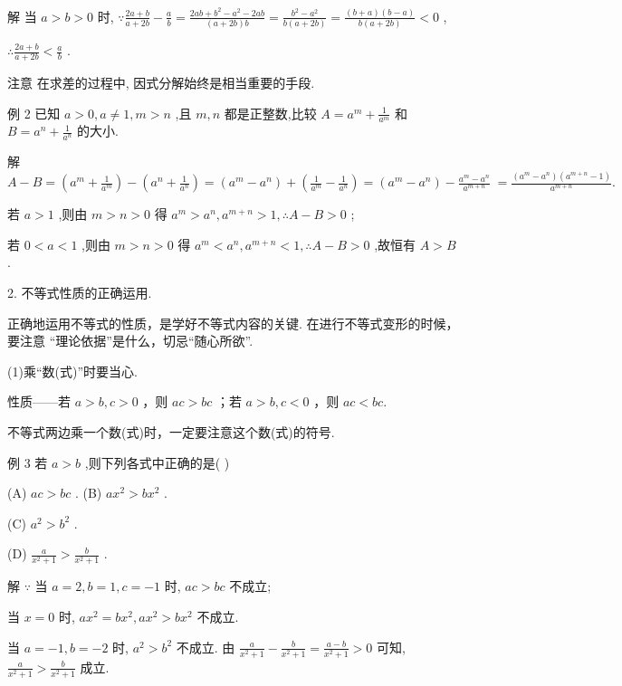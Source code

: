 \documentclass[10pt]{article}
\begin{document}
解 当 \(a > b > 0\) 时, \(\because \frac{{2a} + b}{a + {2b}} - \frac{a}{b} = \frac{{2ab} + {b}^{2} - {a}^{2} - {2ab}}{\left( {a + {2b}}\right) b} = \frac{{b}^{2} - {a}^{2}}{b\left( {a + {2b}}\right) } = \frac{\left( {b + a}\right) \left( {b - a}\right) }{b\left( {a + {2b}}\right) } < 0\) ,

\(\therefore \frac{{2a} + b}{a + {2b}} < \frac{a}{b}\) .

注意 在求差的过程中, 因式分解始终是相当重要的手段.

例 2 已知 \(a > 0,a \neq  1,m > n\) ,且 \(m,n\) 都是正整数,比较 \(A = {a}^{m} + \frac{1}{{a}^{m}}\) 和 \(B = {a}^{n} + \frac{1}{{a}^{n}}\) 的大小.

解 \(A - B = \left( {{a}^{m} + \frac{1}{{a}^{m}}}\right)  - \left( {{a}^{n} + \frac{1}{{a}^{n}}}\right)  = \left( {{a}^{m} - {a}^{n}}\right)  + \left( {\frac{1}{{a}^{m}} - \frac{1}{{a}^{n}}}\right)  = \left( {{a}^{m} - {a}^{n}}\right)  - \frac{{a}^{m} - {a}^{n}}{{a}^{m + n}} \; = \frac{\left( {{a}^{m} - {a}^{n}}\right) \left( {{a}^{m + n} - 1}\right) }{{a}^{m + n}}.\)

若 \(a > 1\) ,则由 \(m > n > 0\) 得 \({a}^{m} > {a}^{n},{a}^{m + n} > 1,\therefore A - B > 0\) ;

若 \(0 < a < 1\) ,则由 \(m > n > 0\) 得 \({a}^{m} < {a}^{n},{a}^{m + n} < 1,\therefore A - B > 0\) ,故恒有 \(A > B\) .

2. 不等式性质的正确运用.

正确地运用不等式的性质，是学好不等式内容的关键. 在进行不等式变形的时候，要注意 “理论依据”是什么，切忌“随心所欲”.

(1)乘“数(式)”时要当心.

性质——若 \(a > b,c > 0\) ，则 \({ac} > {bc}\) ；若 \(a > b,c < 0\) ，则 \({ac} < {bc}.\)

不等式两边乘一个数(式)时，一定要注意这个数(式)的符号.

例 3 若 \(a > b\) ,则下列各式中正确的是( )

(A) \({ac} > {bc}\) . (B) \(a{x}^{2} > b{x}^{2}\) .

(C) \({a}^{2} > {b}^{2}\) .

(D) \(\frac{a}{{x}^{2} + 1} > \frac{b}{{x}^{2} + 1}\) .

解 \(\because\) 当 \(a = 2,b = 1,c =  - 1\) 时, \({ac} > {bc}\) 不成立;

当 \(x = 0\) 时, \(a{x}^{2} = b{x}^{2},a{x}^{2} > b{x}^{2}\) 不成立.

当 \(a =  - 1,b =  - 2\) 时, \({a}^{2} > {b}^{2}\) 不成立. 由 \(\frac{a}{{x}^{2} + 1} - \frac{b}{{x}^{2} + 1} = \frac{a - b}{{x}^{2} + 1} > 0\) 可知, \(\frac{a}{{x}^{2} + 1} > \frac{b}{{x}^{2} + 1}\) 成立.
\end{document}
